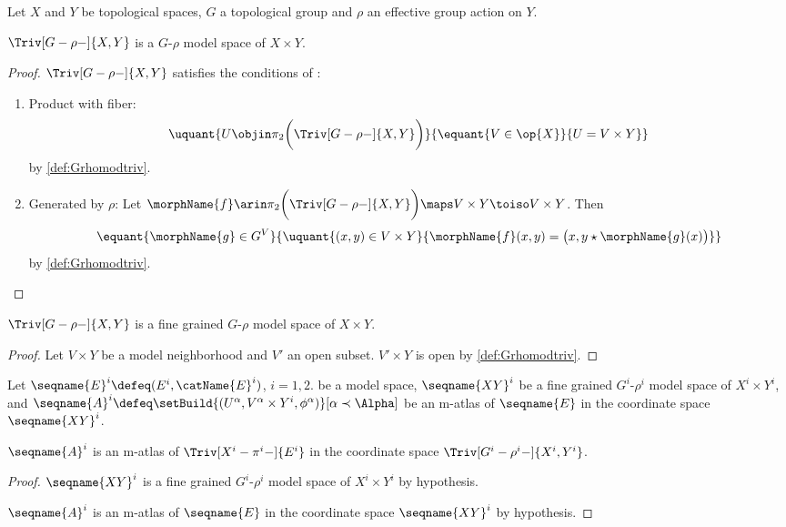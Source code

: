 \documentclass{article}
\begin{document}
\begin{lemma}
\label{lem:Grhomodtriv}
Let $X$ and $Y$ be topological spaces, $G$ a topological group and
$\rho$ an effective group action on $Y$.

$\Triv[G-\rho-]{X,Y}$ is a $G$-$\rho$ model space of $X \times Y$.

\begin{proof}
$\Triv[G-\rho-]{X,Y}$ satisfies the conditions of
:
\begin{enumerate}
\item Product with fiber:
\[
\uquant
  {
    U \objin \pi_2 \biggl ( \Triv[G-\rho-]{X,Y} \biggr )
  }
  {
    \equant
      {
        V \in \op{X}
      }
      {
        U = V \times Y
      }
  }
\]
by \cref{def:Grhomodtriv}.
\item Generated by $\rho$:
Let
$
  \morphName{f} \arin
  \pi_2 \biggl ( \Triv[G-\rho-]{X,Y} \biggr )
  \maps V \times Y \toiso V \times Y
$.
Then
\[
  \equant
    {
      \morphName{g} \in G^V
    }
    {
    \uquant
      {
        {(x,y) \in V \times Y}
      }
      {
        \morphName{f}(x,y) =
          \bigl ( x, y \star \morphName{g}(x) \bigr )
      }
    }
\]
by \cref{def:Grhomodtriv}.
\end{enumerate}
\end{proof}

$\Triv[G-\rho-]{X,Y}$ is a fine grained $G$-$\rho$ model space of $X
\times Y$.

\begin{proof}
Let $V \times Y$ be a model neighborhood and $V'$ an open subset.
$V' \times Y$ is open by \cref{def:Grhomodtriv}.
\end{proof}

Let $\seqname{E}^i \defeq (E^i, \catName{E}^i)$, $i=1,2$.  be a model
space, $\seqname{XY}^i$ be a fine grained $G^i$-$\rho^i$ model space of
$X^i \times Y^i$, and
$
  \seqname{A}^i \defeq
  \setBuild%
    {{(U^\alpha, V^\alpha \times Y^i, \phi^\alpha)}}%
    [{\alpha \prec \Alpha}]
$
be an m-atlas of $\seqname{E}$ in the coordinate space $\seqname{XY}^i$.

$\seqname{A}^i$ is an m-atlas of $\Triv[X^i-\pi^i-]{E^i}$ in the coordinate
space $\Triv[G^i-\rho^i-]{X^i,Y^i}$.

\begin{proof}
\mbox{}
$\seqname{XY}^i$ is a fine grained $G^i$-$\rho^i$ model space of $X^i \times Y^i$
by hypothesis.

$\seqname{A}^i$ is an m-atlas of $\seqname{E}$ in the coordinate space
$\seqname{XY}^i$ by hypothesis.


\end{proof}
\end{lemma}
\end{document}
